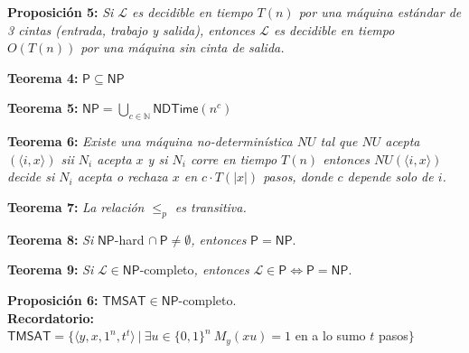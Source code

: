 \documentclass{article}
\begin{document}
\begin{flushleft}
  \textbf{Proposición 5:}
  \textit{Si $\mathcal{L}$ es decidible en tiempo $T(n)$ por una máquina estándar de 3 cintas (entrada,
  trabajo y salida), entonces $\mathcal{L}$ es decidible en tiempo $O(T(n))$ por una máquina sin cinta
  de salida.}
\end{flushleft}

\begin{flushleft}
  \textbf{Teorema 4:}
  $\mathsf{P} \subseteq \mathsf{NP}$ \\[0.5em]
\end{flushleft}

\begin{flushleft}
  \textbf{Teorema 5:}
  $\mathsf{NP} = \bigcup_{c \in \mathbb{N}} \mathsf{NDTime}(n^c)$
\end{flushleft}

\begin{flushleft}
  \textbf{Teorema 6:}
  \textit{Existe una máquina no-determinística $NU$ tal que $NU$ acepta $(\langle i,x \rangle)$ sii $N_i$
  acepta $x$ y si $N_i$ corre en tiempo $T(n)$ entonces $NU(\langle i,x \rangle)$ decide si $N_i$ acepta o 
  rechaza $x$ en $c \cdot T(|x|)$ pasos, donde $c$ depende solo de $i$.}
\end{flushleft}

\begin{flushleft}
  \textbf{Teorema 7:}
  \textit{La relación $\leq_p$ es transitiva.}
\end{flushleft}

\begin{flushleft}
  \textbf{\hypertarget{teo8}{Teorema 8:}}
  \textit{Si }$\mathsf{NP}$-hard $\cap \ \mathsf{P} \neq \emptyset$\textit{, entonces} $\mathsf{P} = 
  \mathsf{NP}$.
\end{flushleft}

\begin{flushleft}
  \textbf{Teorema 9:}
  \textit{Si }$\mathcal{L} \in \mathsf{NP}$-completo\textit{, entonces} $\mathcal{L} \in \mathsf{P} \iff 
  \mathsf{P} = \mathsf{NP}$.
\end{flushleft}

\begin{flushleft}
  \textbf{Proposición 6:}
  $\mathsf{TMSAT} \in \mathsf{NP}$-completo. \\[0.5em]

  \textbf{\textcolor{OliveGreen}{Recordatorio:}} \\[0.5em]

  $\mathsf{TMSAT} = \{ \langle y,x,1^n,t^t \rangle \ | \ \exists u \in \{ 0,1 \}^n \ M_y(xu) = 1$ en a lo 
  sumo $t$ pasos$\}$ 
\end{flushleft}
\end{document}
